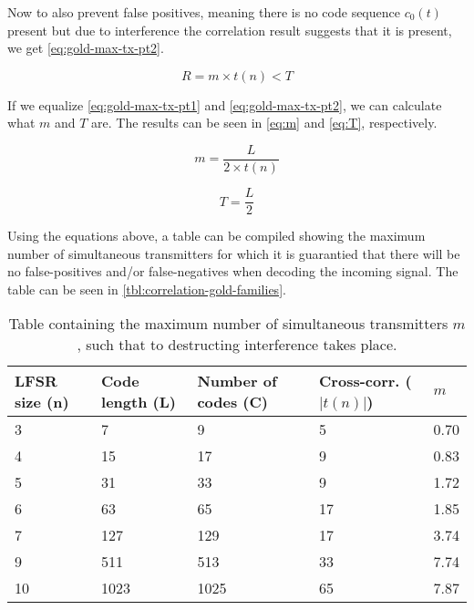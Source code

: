 Now to also prevent false positives, meaning there is no code sequence $c_0(t)$ present but due to interference the correlation result suggests that it is present, we get \autoref{eq:gold-max-tx-pt2}.


\begin{equation}
	\label{eq:gold-max-tx-pt2}
	R = m \times t(n) < T
\end{equation}

If we equalize \autoref{eq:gold-max-tx-pt1} and \autoref{eq:gold-max-tx-pt2}, we can calculate what $m$ and $T$ are.
The results can be seen in \autoref{eq:m} and \autoref{eq:T}, respectively.


\begin{equation}
	\label{eq:m}
	m = \frac{L}{2 \times t(n)}
\end{equation}

\begin{equation}
	\label{eq:T}
	T = \frac{L}{2}
\end{equation}


Using the equations above, a table can be compiled showing the maximum number of simultaneous transmitters for which it is guarantied that there will be no false-positives and/or false-negatives when decoding the incoming signal.
The table can be seen in \autoref{tbl:correlation-gold-families}.
 \cite{holmes2007spread}



\begin{table}[h]
	\centering
	\begin{tabular}{ | l | l | l | l | l |  }

		\hline
		LFSR size (n) 	& Code length (L)	& Number of codes (C)	& Cross-corr. ($|t(n)|$) 	& $m$	\\ \hline

		3				& 7					& 9						& 5							& 0.70	\\ \hline
		4				& 15				& 17					& 9							& 0.83	\\ \hline
		5				& 31				& 33					& 9							& 1.72	\\ \hline
		6				& 63				& 65					& 17						& 1.85	\\ \hline
		7				& 127				& 129					& 17						& 3.74	\\ \hline
		9				& 511				& 513					& 33						& 7.74	\\ \hline%
		10				& 1023				& 1025					& 65						& 7.87	\\ \hline	%

	\end{tabular}
	\caption{Table containing the maximum number of simultaneous transmitters $m$, such that to destructing interference takes place.}
	\label{tbl:correlation-gold-families}
\end{table}

